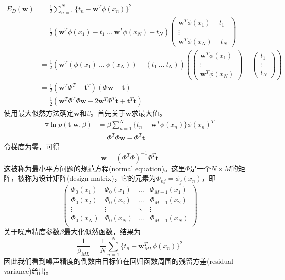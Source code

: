 \begin{equation}
\begin{aligned}
	E_D(\boldsymbol{w})&=\frac{1}{2}\sum_{n=1}^{N}\{t_n-\boldsymbol{w}^T\phi(x_n) \}^2\\
	&=\frac{1}{2}(\boldsymbol{w}^T\phi(x_1)-t_1\ \dots \ \boldsymbol{w}^T\phi(x_N)-t_N)
	\begin{pmatrix}
	\boldsymbol{w}^T\phi(x_1)-t_1\\
	\vdots\\
	\boldsymbol{w}^T\phi(x_N)-t_N
	\end{pmatrix}\\
	&=\frac{1}{2}(\boldsymbol{w}^T(\phi(x_1)\ \dots \ \phi(x_N))-(t_1\ \dots \ t_N))\left(
	\begin{pmatrix}
	\boldsymbol{w}^T\phi(x_1)\\
	\vdots\\
	\boldsymbol{w}^T\phi(x_N)
	\end{pmatrix}-
	\begin{pmatrix}
	t_1\\\vdots\\t_N
	\end{pmatrix}
	\right)\\
	&=\frac{1}{2}(\boldsymbol{w}^T\Phi^T-\boldsymbol{t}^T)(\Phi \boldsymbol{w} - \boldsymbol{t})\\
	&=\frac{1}{2}(\boldsymbol{w}^T\Phi^T\Phi \boldsymbol{w}-2\boldsymbol{w}^T\Phi^T\boldsymbol{t}+\boldsymbol{t}^T\boldsymbol{t})
\end{aligned}
\end{equation}
使用最大似然方法确定$\boldsymbol{w}$和$\beta$。首先关于$\boldsymbol{w}$求最大值。
\begin{equation}
\begin{aligned}
	\triangledown \ln p(\boldsymbol{t}|\boldsymbol{w},\beta)&=\beta\sum_{n=1}^{N}\{t_n-\boldsymbol{w}^T\phi(x_n) \}\phi(x_n)^T\\
	&=\Phi^T\Phi\boldsymbol{w}-\Phi^T\boldsymbol{t}
	\end{aligned}
\end{equation}
令梯度为零，可得
\begin{equation}
	\boldsymbol{w}=(\Phi^T\Phi)^{-1}\Phi^T\boldsymbol{t}
\end{equation}
这被称为最小平方问题的规范方程(normal equation)。这里$\Phi$是一个$N\times M$的矩阵，被称为设计矩阵(design matrix)，它的元素为$\Phi_{nj}=\phi_j(x_n)$，即
\begin{equation}
	\begin{pmatrix}
	\Phi_0(x_1)&\Phi_0(x_1)&\dots&\Phi_{M-1}(x_1)\\
	\Phi_0(x_2)&\Phi_0(x_2)&\dots&\Phi_{M-1}(x_2)\\
	\vdots &\vdots &\ddots &\vdots\\
	\Phi_0(x_N)&\Phi_0(x_N)&\dots&\Phi_{M-1}(x_N)\\
	\end{pmatrix}
\end{equation}
关于噪声精度参数$\beta$最大化似然函数，结果为
\begin{equation}
	\frac{1}{\beta_{ML}}=\frac{1}{N}\sum_{n=1}^{N}\{t_n-\boldsymbol{w}^T_{ML}\phi(x_n) \}^2
\end{equation}
因此我们看到噪声精度的倒数由目标值在回归函数周围的残留方差(residual variance)给出。
